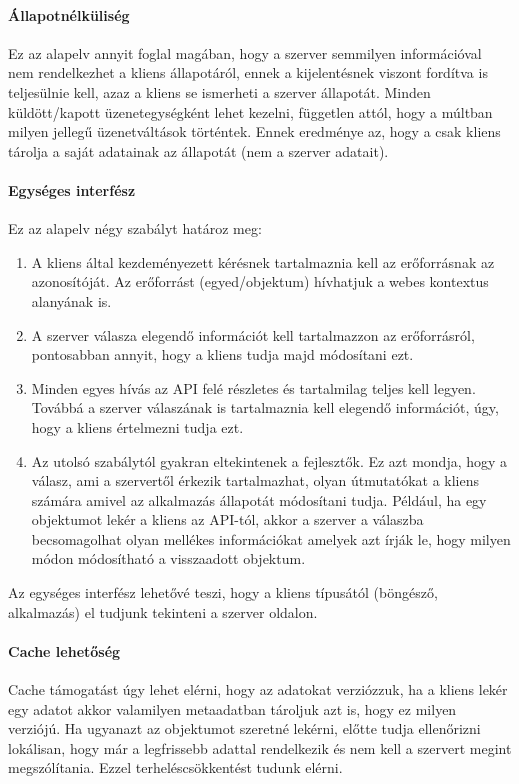 \paragraph{Állapotnélküliség} Ez az alapelv annyit foglal magában, hogy a szerver semmilyen információval nem rendelkezhet a kliens állapotáról, ennek a kijelentésnek viszont fordítva is teljesülnie kell, azaz a kliens se ismerheti a szerver állapotát. Minden küldött/kapott üzenetegységként lehet kezelni, független attól, hogy a múltban milyen jellegű üzenetváltások történtek. Ennek eredménye az, hogy a csak kliens tárolja a saját adatainak az állapotát (nem a szerver adatait).
\paragraph{Egységes interfész} Ez az alapelv négy szabályt határoz meg:
\begin{enumerate}
	\item A kliens által kezdeményezett kérésnek tartalmaznia kell az erőforrásnak az azonosítóját. Az erőforrást (egyed/objektum) hívhatjuk a webes kontextus alanyának is.
	\item A szerver válasza elegendő információt kell tartalmazzon az erőforrásról, pontosabban annyit, hogy a kliens tudja majd módosítani ezt.
	\item Minden egyes hívás az API felé részletes és tartalmilag teljes kell legyen. Továbbá a szerver válaszának is tartalmaznia kell elegendő információt, úgy, hogy a kliens értelmezni tudja ezt.
	\item Az utolsó szabálytól gyakran eltekintenek a fejlesztők. Ez azt mondja, hogy a válasz, ami a szervertől érkezik tartalmazhat, olyan útmutatókat a kliens számára amivel az alkalmazás állapotát módosítani tudja. Például, ha egy objektumot lekér a kliens az API-tól, akkor a szerver a válaszba becsomagolhat olyan mellékes információkat amelyek azt írják le, hogy milyen módon módosítható a visszaadott objektum.
\end{enumerate}
Az egységes interfész lehetővé teszi, hogy a kliens típusától (böngésző, alkalmazás) el tudjunk tekinteni a szerver oldalon.
\paragraph{Cache lehetőség} Cache támogatást úgy lehet elérni, hogy az adatokat verziózzuk, ha a kliens lekér egy adatot akkor valamilyen metaadatban tároljuk azt is, hogy ez milyen verziójú. Ha ugyanazt az objektumot szeretné lekérni, előtte tudja ellenőrizni lokálisan, hogy már a legfrissebb adattal rendelkezik és nem kell a szervert megint megszólítania. Ezzel terheléscsökkentést tudunk elérni.
